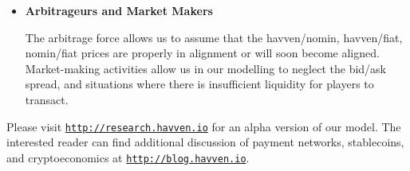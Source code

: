 \begin{itemize}

	
	
	

	\item[] \textbf{Arbitrageurs and Market Makers}

	The arbitrage force allows us to assume that the havven/nomin, havven/fiat, nomin/fiat
	prices are properly in alignment or will soon become aligned. Market-making activities
	allow us in our modelling to neglect the bid/ask spread, and situations where there is insufficient
	liquidity for players to transact.
	
\end{itemize}

\noindent Please visit \href{http://research.havven.io}{\texttt{http://research.havven.io}} for
an alpha version of our model. The interested reader can find additional discussion of payment networks,
stablecoins, and cryptoeconomics at \href{http://blog.havven.io}{\texttt{http://blog.havven.io}}.


\pagebreak




